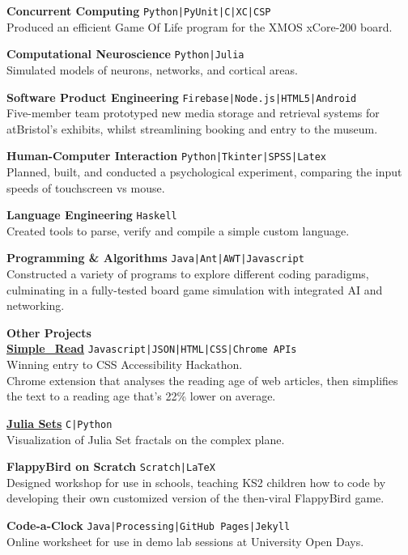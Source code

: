 \documentclass[10pt]{article}
\newcommand{\bold}[1]{\textbf{\textcolor{dark}{#1}}}
\newcommand{\sect}[1]{{\color{dark}\LARGE\textbf{#1}}\vspace{0.2em}\\}
\newcommand{\zz}[3]{{\large\bold{#1}} \hfill {\small \colorbox{light}{\texttt{#3}}}\\{#2}\vspace{0.5em}}
\newcommand{\li}{\textcolor{dark}{|}}
\begin{document}
\begin{minipage}[t]{0.66\textwidth}
\zz{Concurrent Computing}
{Produced an efficient Game Of Life program for the XMOS xCore-200 board.}{Python\li PyUnit\li C\li XC\li CSP}

\zz{Computational Neuroscience}
{Simulated models of neurons, networks, and cortical areas.}{Python\li Julia}

\zz{Software Product Engineering}
{Five-member team prototyped new media storage and retrieval systems for atBristol's exhibits, whilst streamlining booking and entry to the museum.}{Firebase\li Node.js\li HTML5\li Android}

\zz{Human-Computer Interaction}
{Planned, built, and conducted a psychological experiment, comparing the input speeds of touchscreen vs mouse.}{Python\li Tkinter\li SPSS\li Latex}

\zz{Language Engineering}
{Created tools to parse, verify and compile a simple custom language.}{Haskell}

\zz{Programming \& Algorithms}
{Constructed a variety of programs to explore different coding paradigms, culminating in a fully-tested board game simulation with integrated AI and networking.}{Java\li Ant\li AWT\li Javascript}
\\




\vspace{0.5em}


\sect{Other Projects}
\zz{\href{https://github.com/LukeStorry/simple_read}{Simple\_Read}}
{Winning entry to CSS Accessibility Hackathon.\\
Chrome extension that analyses the reading age of web articles, then simplifies the text to a reading age that's 22\% lower on average.}{Javascript\li JSON\li HTML\li CSS\li Chrome APIs}

\zz{\href{https://github.com/LukeStorry/Juliasets}{Julia Sets}}{Visualization of Julia Set fractals on the complex plane.}{C\li Python}

\zz{FlappyBird on Scratch}{Designed workshop for use in schools, teaching KS2 children how to code by developing their own customized version of the then-viral FlappyBird game.}{Scratch\li LaTeX}

\zz{Code-a-Clock}{Online worksheet for use in demo lab sessions at University Open Days.}{Java\li Processing\li GitHub Pages\li Jekyll}


\end{minipage} 
\end{document}
